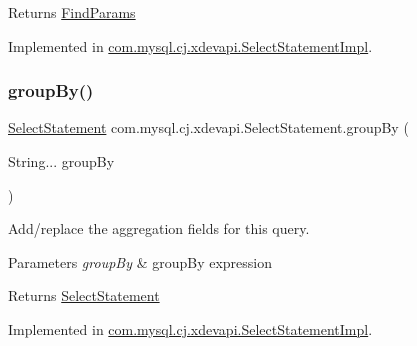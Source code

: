 \begin{DoxyReturn}{Returns}
\mbox{\hyperlink{interfacecom_1_1mysql_1_1cj_1_1xdevapi_1_1_find_params}{Find\+Params}} 
\end{DoxyReturn}


Implemented in \mbox{\hyperlink{classcom_1_1mysql_1_1cj_1_1xdevapi_1_1_select_statement_impl_a887ea3a5dcdb37d2bc6845cfc67631a9}{com.\+mysql.\+cj.\+xdevapi.\+Select\+Statement\+Impl}}.

\mbox{\label{interfacecom_1_1mysql_1_1cj_1_1xdevapi_1_1_select_statement_aa711a5de1c387d46ff0a940329837ae0}} 
\subsubsection{\texorpdfstring{group\+By()}{groupBy()}}
{\footnotesize\ttfamily \mbox{\hyperlink{interfacecom_1_1mysql_1_1cj_1_1xdevapi_1_1_select_statement}{Select\+Statement}} com.\+mysql.\+cj.\+xdevapi.\+Select\+Statement.\+group\+By (\begin{DoxyParamCaption}\item[{String...}]{group\+By }\end{DoxyParamCaption})}

Add/replace the aggregation fields for this query.


\begin{DoxyParams}{Parameters}
{\em group\+By} & group\+By expression \\
\hline
\end{DoxyParams}
\begin{DoxyReturn}{Returns}
\mbox{\hyperlink{interfacecom_1_1mysql_1_1cj_1_1xdevapi_1_1_select_statement}{Select\+Statement}} 
\end{DoxyReturn}


Implemented in \mbox{\hyperlink{classcom_1_1mysql_1_1cj_1_1xdevapi_1_1_select_statement_impl_a88dd14474574f8e6f785aa2341b7c382}{com.\+mysql.\+cj.\+xdevapi.\+Select\+Statement\+Impl}}.

\mbox{\label{interfacecom_1_1mysql_1_1cj_1_1xdevapi_1_1_select_statement_ab1dde96bbcd60811cce5a6181008d441}} 
